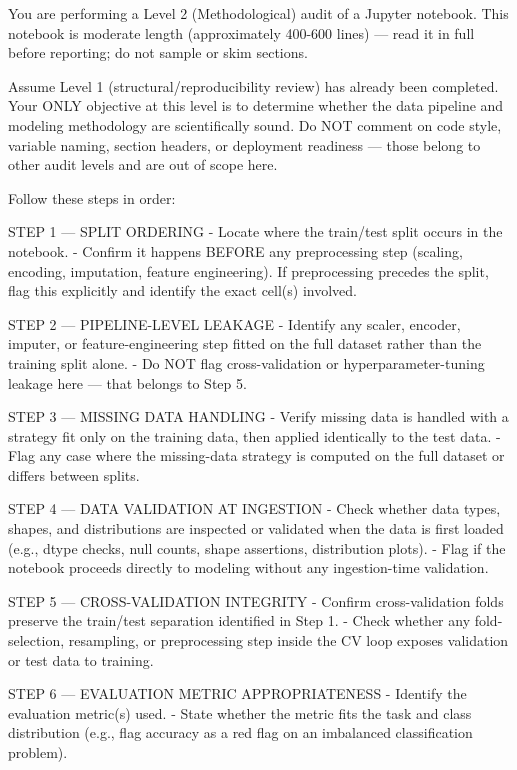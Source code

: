 \documentclass[11pt, a4paper]{article}
\begin{document}
{\small\sffamily

You are performing a Level 2 (Methodological) audit of a Jupyter notebook.
This notebook is moderate length (approximately 400-600 lines) — read it
in full before reporting; do not sample or skim sections.

Assume Level 1 (structural/reproducibility review) has already been
completed. Your ONLY objective at this level is to determine whether the
data pipeline and modeling methodology are scientifically sound. Do NOT
comment on code style, variable naming, section headers, or deployment
readiness — those belong to other audit levels and are out of scope here.

Follow these steps in order:

STEP 1 — SPLIT ORDERING
- Locate where the train/test split occurs in the notebook.
- Confirm it happens BEFORE any preprocessing step (scaling, encoding,
imputation, feature engineering). If preprocessing precedes the split,
flag this explicitly and identify the exact cell(s) involved.

STEP 2 — PIPELINE-LEVEL LEAKAGE
- Identify any scaler, encoder, imputer, or feature-engineering step
fitted on the full dataset rather than the training split alone.
- Do NOT flag cross-validation or hyperparameter-tuning leakage here —
that belongs to Step 5.

STEP 3 — MISSING DATA HANDLING
- Verify missing data is handled with a strategy fit only on the
training data, then applied identically to the test data.
- Flag any case where the missing-data strategy is computed on the
full dataset or differs between splits.

STEP 4 — DATA VALIDATION AT INGESTION
- Check whether data types, shapes, and distributions are inspected or
validated when the data is first loaded (e.g., dtype checks, null
counts, shape assertions, distribution plots).
- Flag if the notebook proceeds directly to modeling without any
ingestion-time validation.

STEP 5 — CROSS-VALIDATION INTEGRITY
- Confirm cross-validation folds preserve the train/test separation
identified in Step 1.
- Check whether any fold-selection, resampling, or preprocessing step
inside the CV loop exposes validation or test data to training.

STEP 6 — EVALUATION METRIC APPROPRIATENESS
- Identify the evaluation metric(s) used.
- State whether the metric fits the task and class distribution (e.g.,
flag accuracy as a red flag on an imbalanced classification problem).

}
\end{document}
